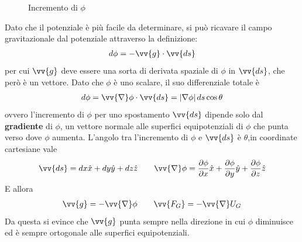 \documentclass[a4paper, oneside]{book}
\begin{document}
\begin{figure}
    \centering
    \caption{Incremento di $\phi$}
\end{figure} \noindent
Dato che il potenziale è più facile da determinare, si può ricavare il campo gravitazionale
dal potenziale attraverso la definizione:
\begin{gather*}
    d\phi = -\vv{g}\cdot \vv{ds} 
\end{gather*} 
per cui $\vv{g}$ deve essere una sorta di derivata spaziale di $\phi$ in $\vv{ds}$, 
che però è un vettore. Dato che $\phi$ è uno scalare, il suo differenziale totale è 
\begin{gather*}
    d\phi = \vv{\nabla}\phi \cdot \vv{ds} = \left| \nabla \phi  \right|   ds \cos\theta
\end{gather*}
ovvero l'incremento di $\phi$ per uno spostamento $\vv{ds}$ dipende solo dal 
\textbf{gradiente} di $\phi$, un vettore normale alle superfici
equipotenziali di $\phi$ che punta verso dove $\phi$ aumenta.  L'angolo tra l'incremento 
di $\phi$ e $\vv{ds}$ è $\theta$,in coordinate cartesiane vale
\begin{gather*}
    \vv{ds} = dx \hat{x} + dy \hat{y} + dz \hat{z}  \qquad \vv{\nabla}\phi = \frac{\partial \phi}{\partial x}\hat{x} +  \frac{\partial \phi}{\partial y}\hat{y} +\frac{\partial \phi}{\partial z}\hat{z}
\end{gather*} 
E allora
\begin{align}
    \vv{g} = -\vv{\nabla} \phi \qquad \vv{F_G} = -\vv{\nabla} U_G 
\end{align}
Da questa si evince che $\vv{g}$ punta sempre nella direzione in cui $\phi$ diminuisce 
ed è sempre ortogonale alle superfici equipotenziali.
\end{document}
